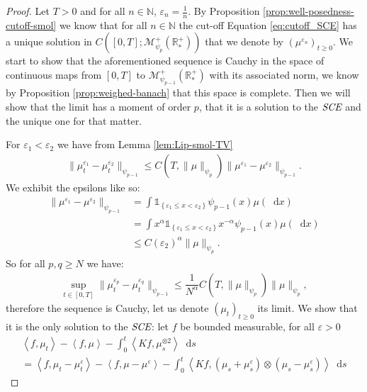 \documentclass[11pt,a4paper]{article}
\newcommand{\NN}{\mathbb{N}}
\newcommand{\RRP}{\mathbb{R}^+_*}
\newcommand{\MC}{\mathcal{M}}
\newcommand{\SCE}{\emph{SCE}}
\newcommand{\Proc}[1]{\left(#1\right)_{t\geq 0}}
\newcommand{\indic}[1]{\mathds{1}_{\left\lbrace#1\right\rbrace}}
\newcommand{\brac}[1]{\left\langle#1\right\rangle}
\newcommand{\dd}{\mathop{}\!\mathrm{d}}
\begin{document}
\begin{proof}
    Let $T > 0$ and for all $n\in \NN$, $\varepsilon_n = \frac1n$. By Proposition \ref{prop:well-posedness-cutoff-smol} we know that for all $n \in \NN$ the cut-off Equation \eqref{eq:cutoff_SCE} has a unique solution in $C\left([0,T]; \MC_{\psi_{p}}^+ (\RRP)\right)$ that we denote by $\Proc{\mu^{\varepsilon_n}}$. We start to show that the aforementioned sequence is Cauchy in the space of continuous maps from $[0,T]$ to $\MC_{\psi_{p-1}}^+ (\RRP)$ with its associated norm, we know by Proposition \ref{prop:weighed-banach} that this space is complete. Then we will show that the limit has a moment of order $p$, that it is a solution to the $\SCE$ and the unique one for that matter.
    
    For $\varepsilon_1 < \varepsilon_2$ we have from Lemma \ref{lem:Lip-smol-TV} 
    \begin{align*}
        \| \mu_t^{\varepsilon_1}- \mu_t^{\varepsilon_2}\|_{\psi_{p-1}} \leq C(T,\|\mu\|_{\psi_{p}}) \| \mu^{\varepsilon_1}- \mu^{\varepsilon_2}\|_{\psi_{p-1}}.
    \end{align*}
    We exhibit the epsilons like so:
    \begin{align*}
        \| \mu^{\varepsilon_1}- \mu^{\varepsilon_2}\|_{\psi_{p-1}} &= \int\indic{\varepsilon_1 \leq x < \varepsilon_2} \psi_{p-1}(x)\mu(\dd x)\\
        &= \int x^{\alpha} \indic{\varepsilon_1 \leq x < \varepsilon_2} x^{-\alpha}\psi_{p-1}(x)\mu(\dd x)\\
        &\leq C(\varepsilon_2)^\alpha \|\mu\|_{\psi_{p}}.
    \end{align*}
    So for all $p,q \geq N$ we have:
    \begin{align*}
        \sup\limits_{t \in [0,T]} \| \mu_t^{\varepsilon_p}- \mu_t^{\varepsilon_q}\|_{\psi_{p-1}} \leq \dfrac{1}{N^\alpha} C(T,\|\mu\|_{\psi_{p}}) \| \mu\|_{\psi_p},
    \end{align*}
    therefore the sequence is Cauchy, let us denote $\Proc{\mu_t}$ its limit. We show that it is the only solution to the $\SCE$: let $f$ be bounded measurable, for all $\varepsilon > 0$
    \begin{multline*}
        \brac{f,\mu_t} - \brac{f,\mu} - \int_0^t\brac{Kf,\mu_s^{\otimes 2}}\dd s \\
        = \brac{f,\mu_t-\mu_t^\varepsilon} - \brac{f,\mu-\mu^\varepsilon} - \int_0^t\brac{Kf,(\mu_s+ \mu^\varepsilon_s)\otimes (\mu_s - \mu^\varepsilon_s)}\dd s
    \end{multline*}

\end{proof}
\end{document}
